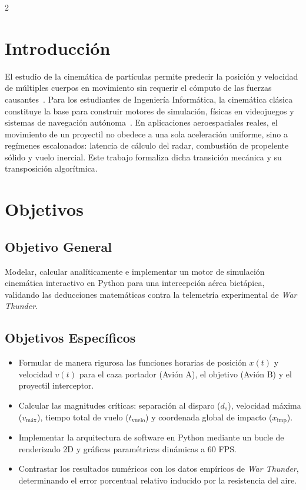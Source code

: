 \documentclass[11pt,letterpaper]{article}
\begin{document}
\begin{multicols}{2}

\section{Introducción}

El estudio de la cinemática de partículas permite predecir la posición y velocidad de múltiples cuerpos en movimiento sin requerir el cómputo de las fuerzas causantes~\cite{hibbeler}. Para los estudiantes de Ingeniería Informática, la cinemática clásica constituye la base para construir motores de simulación, físicas en videojuegos y sistemas de navegación autónoma~\cite{sears}. En aplicaciones aeroespaciales reales, el movimiento de un proyectil no obedece a una sola aceleración uniforme, sino a regímenes escalonados: latencia de cálculo del radar, combustión de propelente sólido y vuelo inercial. Este trabajo formaliza dicha transición mecánica y su transposición algorítmica.

\section{Objetivos}

\subsection{Objetivo General}
Modelar, calcular analíticamente e implementar un motor de simulación cinemática interactivo en Python para una intercepción aérea bietápica, validando las deducciones matemáticas contra la telemetría experimental de \textit{War Thunder}.

\subsection{Objetivos Específicos}
\begin{itemize}[leftmargin=1.2em]
    \item Formular de manera rigurosa las funciones horarias de posición $x(t)$ y velocidad $v(t)$ para el caza portador (Avión A), el objetivo (Avión B) y el proyectil interceptor.
    \item Calcular las magnitudes críticas: separación al disparo ($d_s$), velocidad máxima ($v_{\text{máx}}$), tiempo total de vuelo ($t_{\text{vuelo}}$) y coordenada global de impacto ($x_{\text{imp}}$).
    \item Implementar la arquitectura de software en Python mediante un bucle de renderizado 2D y gráficas paramétricas dinámicas a 60 FPS.
    \item Contrastar los resultados numéricos con los datos empíricos de \textit{War Thunder}, determinando el error porcentual relativo inducido por la resistencia del aire.
\end{itemize}


\end{multicols}
\end{document}
